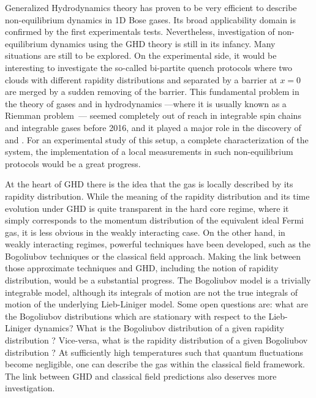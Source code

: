 \documentclass[onecolumn,amsfonts,showpacs,superscriptaddress]{revtex4-1}
\begin{document}
    Generalized Hydrodynamics theory has proven to be very efficient to describe non-equilibrium dynamics in 1D Bose gases. Its broad applicability domain is confirmed by the first experimentals tests.  
    Nevertheless, investigation of non-equilibrium dynamics using the GHD theory is still in its infancy. Many situations are still to be explored. On the experimental side, it would be interesting to investigate the so-called bi-partite quench protocols where two clouds with different rapidity distributions and separated by a barrier at $x=0$ are merged by a sudden removing of the barrier. This fundamental problem in the theory of gases and in hydrodynamics ---where it is usually known as a Riemman problem~\citep{riemann1860fortpflanzung}--- seemed completely out of reach in integrable spin chains and integrable gases before 2016, and it played a major role in the discovery of~\cite{bertini2016transport} and \cite{castro2016emergent}. 
    For an experimental study of this setup, a complete characterization of the system, the implementation of a local measurements in such non-equilibrium protocols would be a great progress. %
    
    At the heart of GHD there is the idea that the gas is locally described by its rapidity distribution. While the meaning of the rapidity distribution and its time evolution under GHD is quite transparent in the hard core regime, where it simply corresponds to the 
    momentum distribution of the equivalent ideal Fermi gas, it is less obvious in the weakly interacting case. On the other hand, in weakly interacting regimes, powerful techniques have been developed, such as the Bogoliubov techniques or the classical field approach. Making the link between those approximate techniques and GHD, including the  notion of rapidity distribution, would be a substantial progress. 
     The Bogoliubov model is a trivially integrable model, although its integrals of motion are not the true integrals of motion of the underlying Lieb-Liniger model. Some open questions are: what are the  Bogoliubov distributions which are stationary with respect to the Lieb-Liniger dynamics?  What is the Bogoliubov distribution of a given rapidity distribution ? Vice-versa, what is the rapidity distribution of a given Bogoliubov distribution ?
     At sufficiently high temperatures such that quantum fluctuations become negligible, one can describe the gas within the classical field framework. The link between GHD and classical field predictions also deserves more investigation.
    
\end{document}
